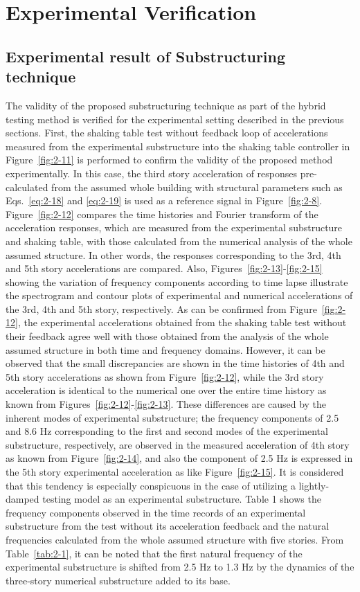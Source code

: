 \section{Experimental Verification}
\subsection{Experimental result of Substructuring technique}

The validity of the proposed substructuring technique as part of the hybrid testing method is verified for the experimental setting described in the previous sections. First, the shaking table test without feedback loop of accelerations measured from the experimental substructure into the shaking table controller in Figure~\ref{fig:2-11} is performed to confirm the validity of the proposed method experimentally. In this case, the third story acceleration of responses pre-calculated from the assumed whole building with structural parameters such as Eqs.~\eqref{eq:2-18} and \eqref{eq:2-19} is used as a reference signal in Figure~\ref{fig:2-8}. Figure~\ref{fig:2-12} compares the time histories and Fourier transform of the acceleration responses, which are measured from the experimental substructure and shaking table, with those calculated from the numerical analysis of the whole assumed structure. In other words, the responses corresponding to the 3rd, 4th and 5th story accelerations are compared. Also, Figures~\ref{fig:2-13}-\ref{fig:2-15} showing the variation of frequency components according to time lapse illustrate the spectrogram and contour plots of experimental and numerical accelerations of the 3rd, 4th and 5th story, respectively. As can be confirmed from Figure~\ref{fig:2-12}, the experimental accelerations obtained from the shaking table test without their feedback agree well with those obtained from the analysis of the whole assumed structure in both time and frequency domains. However, it can be observed that the small discrepancies are shown in the time histories of 4th and 5th story accelerations as shown from Figure~\ref{fig:2-12}, while the 3rd story acceleration is identical to the numerical one over the entire time history as known from Figures~\ref{fig:2-12}-\ref{fig:2-13}. These differences are caused by the inherent modes of experimental substructure; the frequency components of 2.5 and 8.6 Hz corresponding to the first and second modes of the experimental substructure, respectively, are observed in the measured acceleration of 4th story as known from Figure~\ref{fig:2-14}, and also the component of 2.5 Hz is expressed in the 5th story experimental acceleration as like Figure~\ref{fig:2-15}. It is considered that this tendency is especially conspicuous in the case of utilizing a lightly-damped testing model as an experimental substructure. Table 1 shows the frequency components observed in the time records of an experimental substructure from the test without its acceleration feedback and the natural frequencies calculated from the whole assumed structure with five stories. From Table~\ref{tab:2-1}, it can be noted that the first natural frequency of the experimental substructure is shifted from 2.5 Hz to 1.3 Hz by the dynamics of the three-story numerical substructure added to its base.

